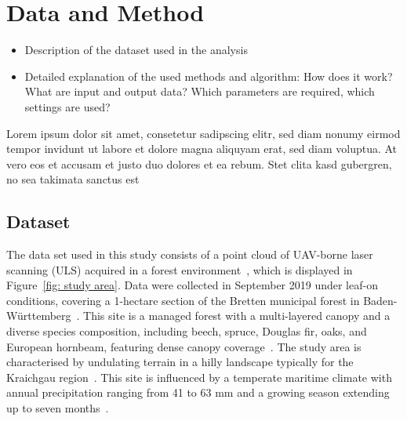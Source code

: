 \documentclass{isprs} %
\begin{document}
\section{Data and Method}\label{Data and Method}



\begin{itemize}
\setlength\itemsep{0em}\setlength\parskip{0em}\setlength\topsep{0em}\setlength\partopsep{0em}\setlength\parsep{0em} 


\item{Description of the dataset used in the analysis} 
\item{Detailed explanation of the used methods and algorithm: How does it work? What are input and output data? Which parameters are required, which settings are used?}

\end{itemize}

Lorem ipsum dolor sit amet, consetetur sadipscing elitr, sed diam nonumy eirmod tempor invidunt ut labore et dolore magna aliquyam erat, sed diam voluptua. At vero eos et accusam et justo duo dolores et ea rebum. Stet clita kasd gubergren, no sea takimata sanctus est 

\subsection{Dataset}\label{sec:Dataset}

The data set used in this study consists of a point cloud of UAV-borne laser scanning (ULS) acquired in a forest environment~\cite{Weiser2022a}, which is displayed in Figure~\ref{fig: study area}. Data were collected in September 2019 under leaf-on conditions, covering a 1-hectare section of the Bretten municipal forest in Baden-Württemberg~\cite{Weiser2022b}. This site is a managed forest with a multi-layered canopy and a diverse species composition, including beech, spruce, Douglas fir, oaks, and European hornbeam, featuring dense canopy coverage~\cite{Weiser2022a}. The study area is characterised by undulating terrain in a hilly landscape typically for the Kraichgau region~\cite{Weiser2022c, Zhang2024}. This site is influenced by a temperate maritime climate with annual precipitation ranging from 41 to 63 mm and a growing season extending up to seven months~\cite{Zhang2024}. 
\end{document}
